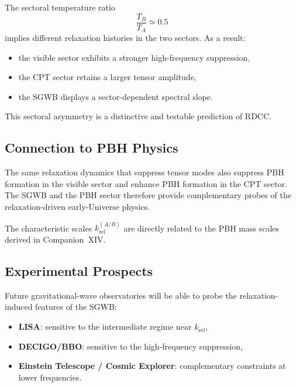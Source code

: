 \documentclass[11pt,a4paper]{article}
\begin{document}
The sectoral temperature ratio
\begin{equation}
\frac{T_{B}}{T_{A}} \simeq 0.5
\end{equation}
implies different relaxation histories in the two sectors. As a result:

\begin{itemize}
\item the visible sector exhibits a stronger high-frequency suppression,
\item the CPT sector retains a larger tensor amplitude,
\item the SGWB displays a sector-dependent spectral slope.
\end{itemize}

This sectoral asymmetry is a distinctive and testable prediction of RDCC.


\subsection{Connection to PBH Physics}

The same relaxation dynamics that suppress tensor modes also suppress PBH formation in the
visible sector and enhance PBH formation in the CPT sector. The SGWB and the PBH sector
therefore provide complementary probes of the relaxation-driven early-Universe physics.

The characteristic scales \(k_{\mathrm{rel}}^{(A/B)}\) are directly related to the PBH mass scales
derived in Companion~XIV.


\subsection{Experimental Prospects}

Future gravitational-wave observatories will be able to probe the relaxation-induced features of
the SGWB:

\begin{itemize}
\item \textbf{LISA}: sensitive to the intermediate regime near \(k_{\mathrm{rel}}\),
\item \textbf{DECIGO/BBO}: sensitive to the high-frequency suppression,
\item \textbf{Einstein Telescope / Cosmic Explorer}: complementary constraints at lower frequencies.
\end{itemize}
\end{document}
